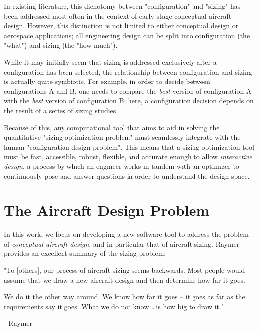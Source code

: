 In existing literature, this dichotomy between "configuration" and "sizing" has been addressed most often in the context of early-stage conceptual aircraft design. However, this distinction is not limited to either conceptual design or aerospace applications; all engineering design can be split into configuration (the "what") and sizing (the "how much").

While it may initially seem that sizing is addressed exclusively after a configuration has been selected, the relationship between configuration and sizing is actually quite symbiotic. For example, in order to decide between configurations A and B, one needs to compare the \textit{best} version of configuration A with the \textit{best} version of configuration B; here, a configuration decision depends on the result of a series of sizing studies.

Because of this, any computational tool that aims to aid in solving the quantitative "sizing optimization problem" must seamlessly integrate with the human "configuration design problem". This means that a sizing optimization tool must be fast, accessible, robust, flexible, and accurate enough to allow \textit{interactive design}, a process by which an engineer works in tandem with an optimizer to continuously pose and answer questions in order to understand the design space.


\section{The Aircraft Design Problem}

In this work, we focus on developing a new software tool to address the problem of \textit{conceptual aircraft design}, and in particular that of aircraft sizing. Raymer \cite{raymer} provides an excellent summary of the sizing problem:

\begin{example}
    "To [others], our process of aircraft sizing seems backwards. Most people would assume that we draw a new aircraft design and then determine how far it goes.

    We do it the other way around. We know how far it goes – it goes as far as the requirements say it goes. What we do not know \dots is how big to draw it."

    \begin{flushright}
        - Raymer \cite{raymer}
    \end{flushright}
\end{example}

